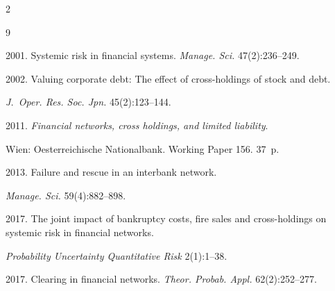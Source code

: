 \begin{multicols}{2}
\renewcommand{\bibname}{\protect\rmfamily References}



\vspace*{-6pt}





{\small\frenchspacing

{%

\begin{thebibliography}{9}








 2001. Systemic risk in financial systems.  \textit{Manage. Sci.} 47(2):236--249.




 2002. Valuing corporate debt: The effect of cross-holdings of stock and debt. 

\textit{J.~Oper. Res. Soc. Jpn.} 45(2):123--144.




 2011. \textit{Financial networks, cross holdings, and limited liability}. 

Wien: Oesterreichische Nationalbank. Working Paper 156. 37~p.




 2013. Failure and rescue in an interbank network. 

\textit{Manage. Sci.} 59(4):882--898.





2017. The joint impact of bankruptcy costs, fire sales and cross-holdings on systemic risk in financial networks.

\textit{Probability Uncertainty Quantitative Risk} 2(1):1--38.




 2017. Clearing in financial networks. \textit{Theor. Probab. Appl.} 62(2):252--277.




\end{thebibliography}}}
\end{multicols}
